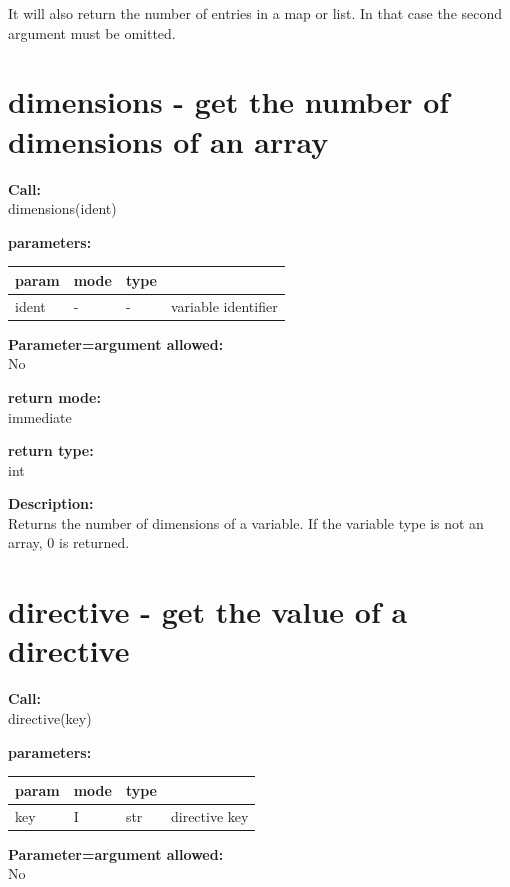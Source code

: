         It will also return the number of entries in a map or list. In that case
        the second argument must be omitted.


    \section{dimensions - get the number of dimensions of an array}\label{sec:ifdimensions}
        
        {\bf Call:} \\
        dimensions(ident)
        
        {\bf parameters:} \\
        \begin{tabular}{| l | l | l | l |}
        \hline
        param  & mode & type & \\
        \hline \hline
        ident & - & - & variable identifier \\ \hline
        \end{tabular}
        
        {\bf Parameter=argument allowed:} \\
        No
        
        {\bf return mode:} \\
        immediate

        {\bf return type:} \\
        int
        
        {\bf Description:} \\
        Returns the number of dimensions of a variable. If the variable type
        is not an array, 0 is returned.


    \section{directive - get the value of a directive}\label{sec:ifdirective}
        
        {\bf Call:} \\
        directive(key)
        
        {\bf parameters:} \\
        \begin{tabular}{| l | l | l | l |}
        \hline
        param  & mode & type & \\
        \hline \hline
        key & I & str & directive key \\ \hline
        \end{tabular}
        
        {\bf Parameter=argument allowed:} \\
        No
        
